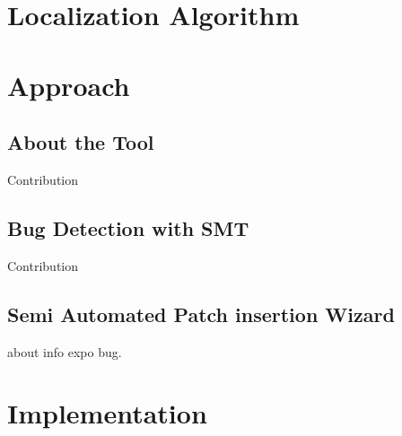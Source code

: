 \chapter{Localization Algorithm}
\label{chapter:Algorithm}

\chapter{Approach}
\label{chapter:Approach}

\section{About the Tool}
Contribution

\section{Bug Detection with SMT}
Contribution

\section{Semi Automated Patch insertion Wizard}
about info expo bug.
 
\chapter{Implementation}
\label{chapter:impl}